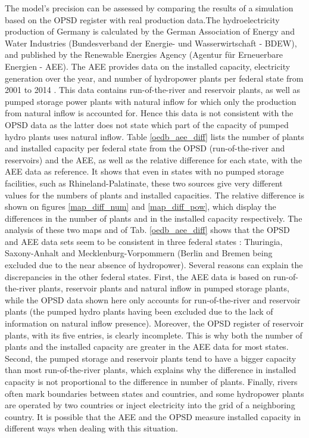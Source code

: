 The model's precision can be assessed by comparing the results of a simulation based on the OPSD register with real production data.\newline The hydroelectricity production of Germany is calculated by the German Association of Energy and Water Industries (Bundesverband der Energie- und Wasserwirtschaft - BDEW), and published by the Renewable Energies Agency (Agentur für Erneuerbare Energien - AEE). The AEE provides data on the installed capacity, electricity generation over the year, and number of hydropower plants per federal state from 2001 to 2014 \cite{aee}. This data contains run-of-the-river and reservoir plants, as well as pumped storage power plants with natural inflow for which only the production from natural inflow is accounted for. Hence this data is not consistent with the OPSD data as the latter does not state which part of the capacity of pumped hydro plants uses natural inflow. \newline
Table \ref{oedb_aee_diff} lists the number of plants and installed capacity per federal state from the OPSD (run-of-the-river and reservoirs) and the AEE, as well as the relative difference for each state, with the AEE data as reference. It shows that even in states with no pumped storage facilities, such as Rhineland-Palatinate, these two sources give very different values for the numbers of plants and installed capacities. \newline
The relative difference is shown on figures \ref{map_diff_num} and \ref{map_diff_pow}, which display the differences in the number of plants and in the installed capacity respectively. The analysis of these two maps and of Tab. \ref{oedb_aee_diff} shows that the OPSD and AEE data sets seem to be consistent in three federal states : Thuringia, Saxony-Anhalt and Mecklenburg-Vorpommern (Berlin and Bremen being excluded due to the near absence of hydropower). Several reasons can explain the discrepancies in the other federal states. First, the AEE data is based on run-of-the-river plants, reservoir plants and natural inflow in pumped storage plants, while the OPSD data shown here only accounts for run-of-the-river and reservoir plants (the pumped hydro plants having been excluded due to the lack of information on natural inflow presence). Moreover, the OPSD register of reservoir plants, with its five entries, is clearly incomplete. This is why both the number of plants and the installed capacity are greater in the AEE data for most states. Second, the pumped storage and reservoir plants tend to have a bigger capacity than most run-of-the-river plants, which explains why the difference in installed capacity is not proportional to the difference in number of plants. Finally, rivers often mark boundaries between states and countries, and some hydropower plants are operated by two countries or inject electricity into the grid of a neighboring country. It is possible that the AEE and the OPSD measure installed capacity in different ways when dealing with this situation.

